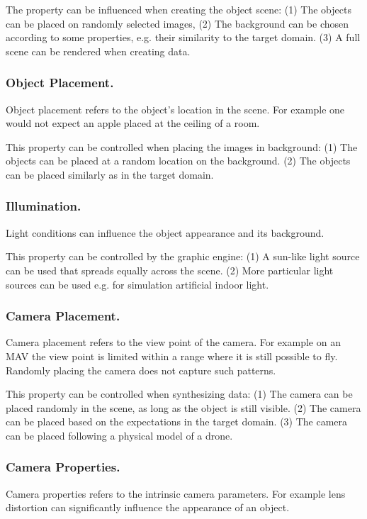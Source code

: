	The property can be influenced when creating the object scene: (1) The objects can be placed on randomly selected images, (2) The background can be chosen according to some properties, e.g. their similarity to the target domain. (3) A full scene can be rendered when creating data.
	
\subsubsection{Object Placement.} 
	
	Object placement refers to the object's location in the scene. For example one would not expect an apple placed at the ceiling of a room.
	
	This property can be controlled when placing the images in background: (1) The objects can be placed at a random location on the background. (2) The objects can be placed similarly as in the target domain.
	
\subsubsection{Illumination.} 
	
	Light conditions can influence the object appearance and its background.
	
	This property can be controlled by the graphic engine: (1) A sun-like light source can be used that spreads equally across the scene. (2) More particular light sources can be used e.g. for simulation artificial indoor light.
	
	
\subsubsection{Camera Placement.} 
	
	Camera placement refers to the view point of the camera. For example on an \ac{MAV} the view point is limited within a range where it is still possible to fly. Randomly placing the camera does not capture such patterns.
	
	This property can be controlled when synthesizing data: (1) The camera can be placed randomly in the scene, as long as the object is still visible. (2) The camera can be placed based on the expectations in the target domain. (3) The camera can be placed following a physical model of a drone.
	
\subsubsection{Camera Properties.} Camera properties refers to the intrinsic camera parameters. For example lens distortion can significantly influence the appearance of an object.
	
